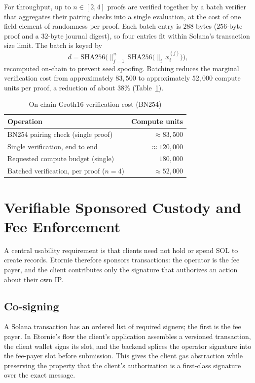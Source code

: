 \documentclass[conference]{IEEEtran}
\begin{document}
For throughput, up to $n \in [2, 4]$ proofs are verified together by a batch
verifier that aggregates their pairing checks into a single evaluation, at the
cost of one field element of randomness per proof. Each batch entry is
$288$ bytes ($256$-byte proof and a $32$-byte journal digest), so four entries
fit within Solana's transaction size limit. The batch is keyed by
\begin{equation}
d = \mathrm{SHA256}\Big(\big\|_{j=1}^{n}\, \mathrm{SHA256}\big(\big\|_i\,
x_i^{(j)}\big)\Big),
\end{equation}
recomputed on-chain to prevent seed spoofing. Batching reduces the marginal
verification cost from approximately $83{,}500$ to approximately $52{,}000$
compute units per proof, a reduction of about $38\%$
(Table~\ref{tab:cost}).

\begin{table}[t]
\caption{On-chain Groth16 verification cost (BN254)}
\label{tab:cost}
\centering
\begin{tabular}{@{}lr@{}}
\toprule
Operation & Compute units \\
\midrule
BN254 pairing check (single proof) & $\approx 83{,}500$ \\
Single verification, end to end & $\approx 120{,}000$ \\
Requested compute budget (single) & $180{,}000$ \\
Batched verification, per proof ($n{=}4$) & $\approx 52{,}000$ \\
\bottomrule
\end{tabular}
\end{table}

\section{Verifiable Sponsored Custody and Fee Enforcement}
\label{sec:custody}

A central usability requirement is that clients need not hold or spend SOL to
create records. Etornie therefore sponsors transactions: the operator is the
fee payer, and the client contributes only the signature that authorizes an
action about their own IP.

\subsection{Co-signing}

A Solana transaction has an ordered list of required signers; the first is the
fee payer. In Etornie's flow the client's application assembles a versioned
transaction, the client wallet signs its slot, and the backend splices the
operator signature into the fee-payer slot before submission. This gives the
client gas abstraction while preserving the property that the client's
authorization is a first-class signature over the exact message.
\end{document}
